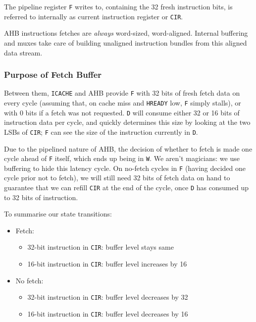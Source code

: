 \documentclass{article}
\begin{document}
The pipeline register \texttt{F} writes to, containing the 32 fresh instruction bits, is referred to internally as current instruction register or \texttt{CIR}.

AHB instructions fetches are \textit{always} word-sized, word-aligned. Internal buffering and muxes take care of building unaligned instruction bundles from this aligned data stream.

\subsubsection{Purpose of Fetch Buffer}

Between them, \texttt{ICACHE} and AHB provide \texttt{F} with 32 bits of fresh fetch data on every cycle (assuming that, on cache miss and \texttt{HREADY} low, \texttt{F} simply stalls), or with 0 bits if a fetch was not requested. \texttt{D} will consume either 32 or 16 bits of instruction data per cycle, and quickly determines this size by looking at the two LSBs of \texttt{CIR}; \texttt{F} can see the size of the instruction currently in \texttt{D}. 

Due to the pipelined nature of AHB, the decision of whether to fetch is made one cycle ahead of \texttt{F} itself, which ends up being in \texttt{W}. We aren't magicians: we use buffering to hide this latency cycle. On no-fetch cycles in \texttt{F} (having decided one cycle prior not to fetch), we will still need 32 bits of fetch data on hand to guarantee that we can refill \texttt{CIR} at the end of the cycle, once \texttt{D} has consumed up to 32 bits of instruction.

To summarise our state transitions:

\begin{itemize}
\item Fetch:
	\begin{itemize}
	\item 32-bit instruction in \texttt{CIR}: buffer level stays same
	\item 16-bit instruction in \texttt{CIR}: buffer level increases by 16
	\end{itemize}
\item No fetch:
	\begin{itemize}
	\item 32-bit instruction in \texttt{CIR}: buffer level decreases by 32
	\item 16-bit instruction in \texttt{CIR}: buffer level decreases by 16
	\end{itemize}
\end{itemize}
\end{document}
